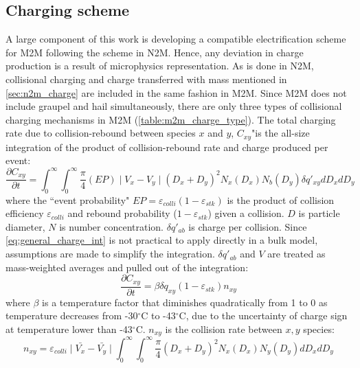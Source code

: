 \subsection{Charging scheme}
\label{sec:morr_charge}
A large component of this work is developing a compatible electrification scheme for M2M following the scheme in N2M. Hence, any deviation in charge production is a result of microphysics representation. As is done in N2M, collisional charging and charge transferred with mass mentioned in \ref{sec:n2m_charge} are included in the same fashion in M2M. Since M2M does not include graupel and hail simultaneously, there are only three types of collisional charging mechanisms in M2M (\ref{table:m2m_charge_type}). The total charging rate due to collision-rebound between species $x$ and $y$, $C_{xy}$"is the all-size integration of the product of collision-rebound rate and charge produced per event:
\begin{equation}
    \frac{\partial C_{xy}}{\partial t} = 
    \int_{0}^{\infty} \int_{0}^{\infty}
    \frac{\pi}{4} 
    (EP)
    \mid V_x-V_y \mid
    (D_x+D_y)^2 
    N_x(D_x) N_b(D_y)
    \delta q'_{xy}
    dD_x dD_y
    \label{eq:general_charge_int}
\end{equation}
where the ``event probability" $EP=\varepsilon_{colli}(1-\varepsilon_{stk})$ is the product of collision efficiency $\varepsilon_{colli}$ and rebound probability ($1-\varepsilon_{stk}$) given a collision. $D$ is particle diameter, $N$ is number concentration. $\delta q'_{ab}$ is charge per collision. Since \ref{eq:general_charge_int} is not practical to apply directly in a bulk model, assumptions are made to simplify the integration. $\delta q'_{ab}$ and $V$ are treated as mass-weighted averages and pulled out of the integration:
\begin{equation}
    \frac{\partial C_{xy}}{\partial t} = 
    \beta
    \delta q_{xy}
    (1-\varepsilon_{stk})
    n_{xy}
    \label{eq:3.14}
\end{equation}
where $\beta$ is a temperature factor that diminishes quadratically from 1 to 0 as temperature decreases from -30$^\circ$C to -43$^\circ$C, due to the uncertainty of charge sign at temperature lower than -43$^\circ$C. $n_{xy}$ is the collision rate between $x,y$ species:
\begin{equation}
    n_{xy} = 
    \varepsilon_{colli}
    \mid \bar{V_x}-\bar{V_y} \mid
    \int_0^{\infty} \int_0^{\infty}
    \frac{\pi}{4}
    (D_x+D_y)^2
    N_x(D_x) N_y(D_y)
    dD_x dD_y
    \label{eq:3.15}
\end{equation}
